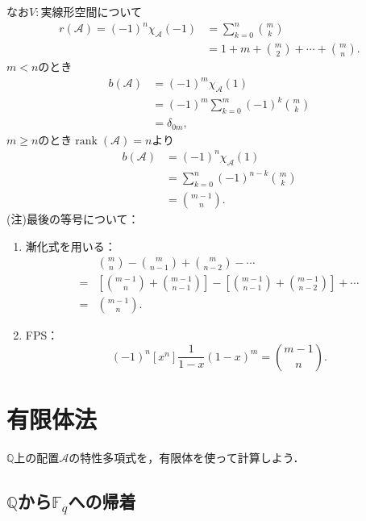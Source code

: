 \documentclass[xelatex,ja=standard,a4paper,14pt,everyparhook=compat]{bxjsarticle}
\newcommand{\bbQ}{\mathbb{Q}}
\newcommand{\bbF}{\mathbb{F}}
\newcommand{\mcA}{\mathcal{A}}
\DeclareMathOperator{\rank}{rank}
\theoremstyle{definition}
\begin{document}
なお$V:\text{実線形空間}$について \begin{align*}
    r(\mcA) = (-1)^n \chi_\mcA(-1)
     & = \sum_{k=0}^n \binom{m}{k}                     \\
     & = 1 + m + \binom{m}{2} + \cdots + \binom{m}{n}.
\end{align*}
$m < n$のとき \begin{align*}
    b(\mcA) & = (-1)^m \chi_\mcA(1)                     \\
            & = (-1)^m \sum_{k=0}^m (-1)^k \binom{m}{k} \\
            & = \delta_{0m},
\end{align*}
$m \geq n$のとき$\rank(\mcA) = n$より \begin{align*}
    b(\mcA) & = (-1)^n \chi_\mcA(1)                  \\
            & = \sum_{k=0}^n (-1)^{n-k} \binom{m}{k} \\
            & = \binom{m-1}{n}.
\end{align*}
(注)最後の等号について： \begin{enumerate}
    \item 漸化式を用いる： \begin{align*}
                  & \binom{m}{n} - \binom{m}{n-1} + \binom{m}{n-2} - \cdots                                                \\
              ={} & \left[\binom{m-1}{n}+\binom{m-1}{n-1}\right] - \left[\binom{m-1}{n-1}+\binom{m-1}{n-2}\right] + \cdots \\
              ={}& \binom{m-1}{n}.
          \end{align*}
    \item FPS： \begin{equation*}
        (-1)^n [x^n] \frac{1}{1-x}(1-x)^m = \binom{m-1}{n}.
    \end{equation*}
\end{enumerate}

\newpage

\section{有限体法}

$\bbQ$上の配置$\mcA$の特性多項式を，有限体を使って計算しよう．

\subsection{$\bbQ$から$\bbF_q$への帰着}
\end{document}

